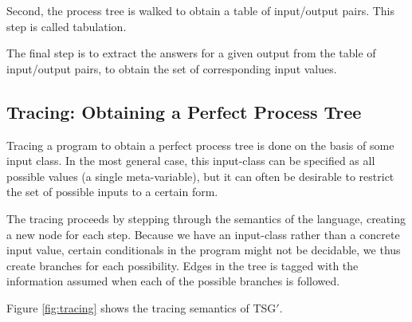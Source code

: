 \documentclass[10pt]{../sigplanconf}
\begin{document}
Second, the process tree is walked to obtain a table of input/output
pairs. This step is called tabulation.

The final step is to extract the answers for a given output from the
table of input/output pairs, to obtain the set of corresponding input
values.

\subsection{Tracing: Obtaining a Perfect Process Tree}
Tracing a program to obtain a perfect process tree is done on the
basis of some input class. In the most general case, this input-class
can be specified as all possible values (a single meta-variable), but
it can often be desirable to restrict the set of possible inputs to a
certain form.

The tracing proceeds by stepping through the semantics of the
language, creating a new node for each step. Because we have an
input-class rather than a concrete input value, certain conditionals
in the program might not be decidable, we thus create branches for
each possibility. Edges in the tree is tagged with the information
assumed when each of the possible branches is followed.

Figure \ref{fig:tracing} shows the tracing semantics of TSG$'$. 
\end{document}

